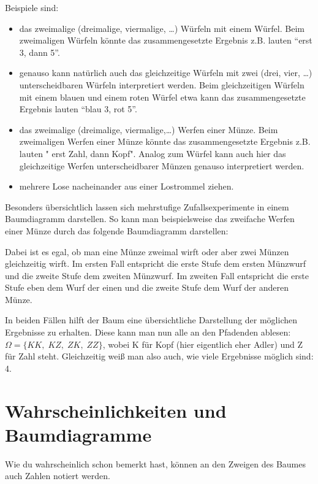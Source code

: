 \documentclass[
  ngerman,
]{book}
\begin{document}
Beispiele sind:

\begin{itemize}
\item
  das zweimalige (dreimalige, viermalige, \ldots) Würfeln mit einem Würfel. Beim zweimaligen Würfeln könnte das zusammengesetzte Ergebnis z.B. lauten ``erst 3, dann 5''.
\item
  genauso kann natürlich auch das gleichzeitige Würfeln mit zwei (drei, vier, \ldots) unterscheidbaren Würfeln interpretiert werden. Beim gleichzeitigen Würfeln mit einem blauen und einem roten Würfel etwa kann das zusammengesetzte Ergebnis lauten ``blau 3, rot 5''.
\item
  das zweimalige (dreimalige, viermalige,\ldots) Werfen einer Münze. Beim zweimaligen Werfen einer Münze könnte das zusammengesetzte Ergebnis z.B. lauten " erst Zahl, dann Kopf". Analog zum Würfel kann auch hier das gleichzeitige Werfen unterscheidbarer Münzen genauso interpretiert werden.
\item
  mehrere Lose nacheinander aus einer Lostrommel ziehen.
\end{itemize}

Besonders übersichtlich lassen sich mehrstufige Zufallsexperimente in einem Baumdiagramm darstellen. So kann man beispielsweise das zweifache Werfen einer Münze durch das folgende Baumdiagramm darstellen:

Dabei ist es egal, ob man eine Münze zweimal wirft oder aber zwei Münzen gleichzeitig wirft. Im ersten Fall entspricht die erste Stufe dem ersten Münzwurf und die zweite Stufe dem zweiten Münzwurf. Im zweiten Fall entspricht die erste Stufe eben dem Wurf der einen und die zweite Stufe dem Wurf der anderen Münze.

In beiden Fällen hilft der Baum eine übersichtliche Darstellung der möglichen Ergebnisse zu erhalten. Diese kann man nun alle an den Pfadenden ablesen: \(\Omega=\{KK,\; KZ,\; ZK,\; ZZ\}\), wobei K für Kopf (hier eigentlich eher Adler) und Z für Zahl steht. Gleichzeitig weiß man also auch, wie viele Ergebnisse möglich sind: 4.

\hypertarget{wahrscheinlichkeiten-und-baumdiagramme}{%
\section{Wahrscheinlichkeiten und Baumdiagramme}\label{wahrscheinlichkeiten-und-baumdiagramme}}

Wie du wahrscheinlich schon bemerkt hast, können an den Zweigen des Baumes auch Zahlen notiert werden.
\end{document}
